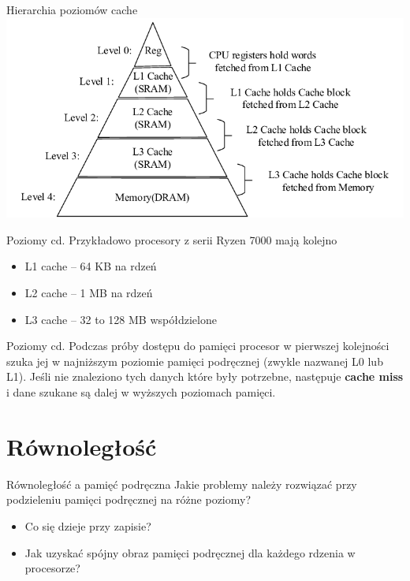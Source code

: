 \documentclass{beamer}
\begin{document}
\begin{frame}{Hierarchia poziomów cache}
\centering
\includegraphics[scale=1]{assets/cache_hierarchy.png}
\end{frame}

\begin{frame}{Poziomy cd.}
Przykładowo procesory z serii Ryzen 7000 mają kolejno
\begin{itemize}
    \item L1 cache – 64 KB na rdzeń
    \item L2 cache – 1 MB na rdzeń
    \item L3 cache – 32 to 128 MB współdzielone
\end{itemize}

\end{frame}

\begin{frame}{Poziomy cd.}
    Podczas próby dostępu do pamięci procesor w pierwszej kolejności szuka jej w najniższym poziomie pamięci podręcznej (zwykle nazwanej L0 lub L1). Jeśli nie znaleziono tych danych które były potrzebne, następuje \textbf{cache miss} i dane szukane są dalej w wyższych poziomach pamięci.
\end{frame}

\section{Równoległość}
\begin{frame}{Równoległość a pamięć podręczna}
Jakie problemy należy rozwiązać przy podzieleniu pamięci podręcznej na różne poziomy?
\pause
\begin{itemize}
    \item Co się dzieje przy zapisie?
    \pause
    \item Jak uzyskać spójny obraz pamięci podręcznej dla każdego rdzenia w procesorze?
\end{itemize}
\end{frame}
\end{document}
